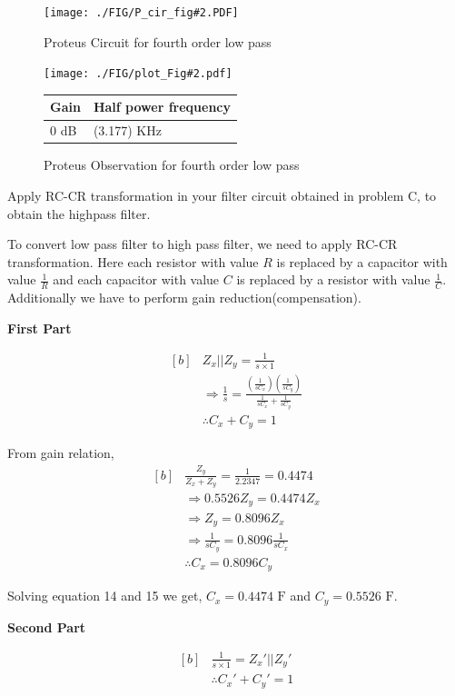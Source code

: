 \documentclass[a4paper,11pt]{article}
\newcommand\ddfrac[2]{\frac{\displaystyle #1}{\displaystyle #2}}
\newcommand{\Porcirobs}[4]{
    \begin{figure}[H] %
        \centering
        \texttt{[image: ./FIG/P\_cir\_fig\#2.PDF]}
        \caption{Proteus Circuit for #2}
    \end{figure}


    \begin{figure}[H]  %
        \centering
        \texttt{[image: ./FIG/plot\_Fig\#2.pdf]}
        \begin{tabular}[H]{| m{14em}| m{22em}|}
            \hline
            \rowcolor[rgb]{0.569,0.647,0.947} \textbf{Gain } & \textbf{Half power frequency} \\ \hline
            #3 dB         & (#4) KHz     \\  \hline
        \end{tabular}
        \caption{Proteus Observation for #2}
    \end{figure}
}
\begin{document}
\Porcirobs{0.95}{fourth order low pass}{0}{3.177}


\pagebreak
\begin{Q}
    {
        Apply RC-CR transformation in your filter circuit obtained in problem C, to obtain the highpass
        filter.
    }
\end{Q}

To convert low pass filter to high pass filter, we need to apply RC-CR transformation. Here each resistor with value $R$ is replaced by a capacitor with value $\ddfrac{1}{R}$ and each capacitor with value $C$ is replaced by a resistor with value $\ddfrac{1}{C}$. Additionally we have to perform gain reduction(compensation).

\textbf{First Part}

\begin{equation}
    \begin{aligned}[b]
         & Z_x||Z_y = \frac{1}{s\times1}                                                                                          \\
         & \Rightarrow \frac{1}{s}=\ddfrac{\left(\frac{1}{sC_x}\right)\left(\frac{1}{sC_y}\right)}{\frac{1}{sC_x}+\frac{1}{sC_y}} \\
         & \therefore C_x+C_y=1
    \end{aligned}
\end{equation}

From gain relation,
\begin{equation}
    \begin{aligned}[b]
         & \frac{Z_y}{Z_x+Z_y}=\frac{1}{2.2347}=0.4474      \\
         & \Rightarrow 0.5526Z_y=0.4474Z_x                  \\
         & \Rightarrow Z_y=0.8096 Z_x                       \\
         & \Rightarrow \frac{1}{sC_y}=0.8096 \frac{1}{sC_x} \\
         & \therefore C_x=0.8096 C_y
    \end{aligned}
\end{equation}

Solving equation 14 and 15 we get, $C_x=0.4474\text{ F}$ and $C_y=0.5526\text{ F}$.

\textbf{Second Part}

\begin{equation}
    \begin{aligned}[b]
         & \frac{1}{s\times1}=Z_x'||Z_y' \\
         & \therefore C_x'+C_y'=1
    \end{aligned}
\end{equation}
\end{document}
